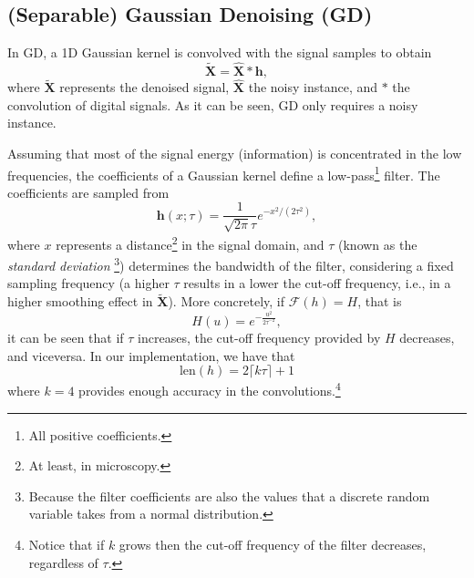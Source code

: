 \documentclass{article}
\begin{document}




\subsection{(Separable) Gaussian Denoising (GD)}

In GD, a 1D Gaussian kernel is convolved with the signal samples to
obtain
\begin{equation}
  \tilde{\mathbf{X}} = \hat{\mathbf{X}}*\mathbf{h},
  \label{eq:GF}
\end{equation}
where $\tilde{\mathbf{X}}$ represents the denoised signal,
$\hat{\mathbf{X}}$ the noisy instance, and $*$ the convolution of
digital signals. As it can be seen, GD only requires a noisy instance.

Assuming that most of the signal energy (information) is concentrated
in the low frequencies, the coefficients of a Gaussian kernel define a
low-pass\footnote{All positive coefficients.} filter. The coefficients
are sampled from
\begin{equation}
  \mathbf{h}(x;\tau) = \frac{1}{\sqrt{2\pi}\tau}e^{{-x}^2/(2\tau^2)},
  \label{eq:GK}
\end{equation}
where $x$ represents a distance\footnote{At least, in microscopy.} in
the signal domain, and $\tau$ (known as the \emph{standard deviation}
\footnote{Because the filter coefficients are also the values that a
  discrete random variable takes from a normal distribution.})
determines the bandwidth of the filter, considering a fixed sampling
frequency (a higher $\tau$ results in a lower the cut-off frequency,
i.e., in a higher smoothing effect in $\tilde{\mathbf{X}}$). More
concretely, if $\mathcal{F}(h)=H$, that is
\begin{equation}
  H(u) = e^{-\frac{u^2}{2\tau^{-2}}},
\end{equation}
it can be seen that if $\tau$ increases, the cut-off frequency
provided by $H$ decreases, and viceversa. In our implementation, we
have that
\begin{equation}
  \mathrm{len}(h) = 2\lceil k\tau\rceil + 1
\end{equation}
where $k=4$ provides enough accuracy in the
convolutions.\footnote{Notice that if $k$ grows then the cut-off
  frequency of the filter decreases, regardless of $\tau$.}
\end{document}
